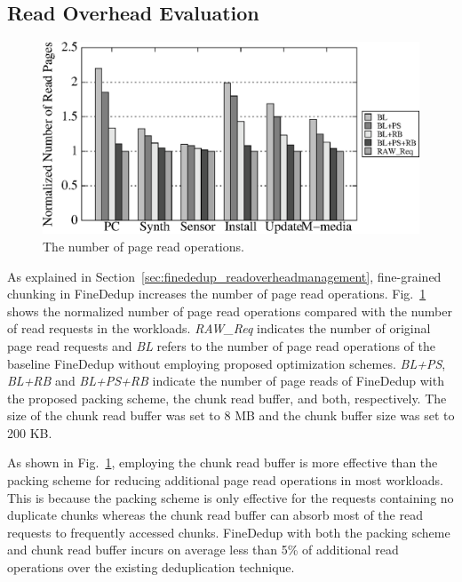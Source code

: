 \subsection{Read Overhead Evaluation}
\label{sec:finededup_readoverheadevaluation}

\begin{figure}[t]
	\center
	\includegraphics[scale=0.6]{figure/finededup/increasedPageRead}
	\caption{The number of page read operations.} %
	\label{fig:pageread}
\end{figure}

As explained in Section~\ref{sec:finededup_readoverheadmanagement}, 
fine-grained chunking in FineDedup increases the number of page read operations. 
Fig.~\ref{fig:pageread} shows the normalized number of page read operations compared with the number of read requests
in the workloads.
\textit{RAW\_Req} indicates the number of original page read requests and \textit{BL} refers to the number of page
read operations of the baseline FineDedup without employing proposed optimization schemes. 
\textit{BL+PS}, \textit{BL+RB} and \textit{BL+PS+RB} indicate the number of page reads of FineDedup with the proposed
packing scheme, the chunk read buffer, and both, respectively. 
The size of the chunk read buffer was set to 8 MB and the chunk buffer size was set to 200 KB.

As shown in Fig.~\ref{fig:pageread}, employing the chunk read buffer is more effective than the packing scheme 
for reducing additional page read operations in most workloads. This is because the packing scheme is only
effective for the requests containing no duplicate chunks whereas the chunk read buffer can absorb most of the read requests 
to frequently accessed chunks.
FineDedup with both the packing scheme and chunk read buffer incurs on average less than 5\% of additional read operations
over the existing deduplication technique.

